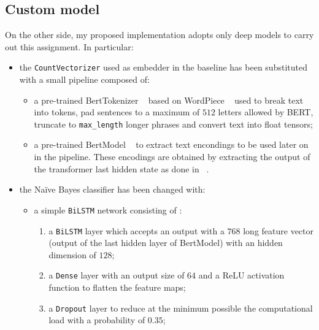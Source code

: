 \subsection{Custom model}
\label{subsec:custom}
On the other side, my proposed implementation adopts only deep models to carry out this assignment. In particular:
\begin{itemize}

    \item the \texttt{CountVectorizer} used as embedder in the baseline has been substituted with a small pipeline composed of:
        \begin{itemize}

            \item a pre-trained BertTokenizer ~\cite{tokenizer} based on WordPiece ~\cite{wordpiece} used to break text into tokens, 
                pad sentences to a maximum of  $512$ letters allowed by BERT, truncate to \texttt{max\_length} longer phrases 
                and convert text into float tensors;

            \item a pre-trained BertModel ~\cite{model} to extract text encondings to be used later on in the pipeline. These encodings
                are obtained by extracting the output of the transformer last hidden state as done in ~\cite{mtl}.

        \end{itemize}

    \item the Na\"{i}ve Bayes classifier has been changed with: 
        \begin{itemize}

            \item a simple \texttt{BiLSTM} network consisting of : 
                \begin{enumerate}

                    \item a \texttt{BiLSTM} layer which accepts an output with a $768$ long feature vector (output of the last hidden 
                        layer of BertModel) with an hidden dimension of $128$;

                    \item a \texttt{Dense} layer with an output size of $64$ and a ReLU activation function to flatten the feature maps;

                    \item a \texttt{Dropout} layer to reduce at the minimum possible the computational load with a probability of $0.35$;


\end{enumerate}
\end{itemize}
\end{itemize}
